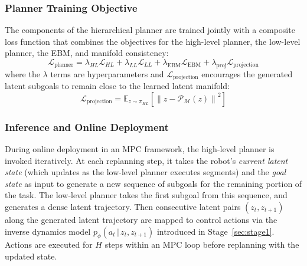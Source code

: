\documentclass{article} %
\begin{document}
\subsubsection{Planner Training Objective}
\vspace{-5pt}
The components of the hierarchical planner are trained jointly with a composite loss function that combines the objectives for the high-level planner, the low-level planner, the EBM, and manifold consistency:
\begin{equation}
\mathcal{L}_{\text{planner}} = \lambda_{HL} \mathcal{L}_{HL} + \lambda_{LL} \mathcal{L}_{LL} + \lambda_{\text{EBM}} \mathcal{L}_{\text{EBM}} + \lambda_{\text{proj}} \mathcal{L}_{\text{projection}}
\end{equation}
where the $\lambda$ terms are hyperparameters and $\mathcal{L}_{\text{projection}}$ encourages the generated latent subgoals to remain close to the learned latent manifold:
\begin{equation}
\mathcal{L}_{\text{projection}} = \mathbb{E}_{z \sim \pi_{HL}} \left[ \left\| z - \mathcal{P}_{\mathcal{M}}(z) \right\|^2 \right]
\end{equation}

\subsubsection{Inference and Online Deployment}
\vspace{-5pt}
During online deployment in an MPC framework, the high-level planner is invoked iteratively. At each replanning step, it takes the robot's \textit{current latent state} (which updates as the low-level planner executes segments) and the \textit{goal state} as input to generate a new sequence of subgoals for the remaining portion of the task. The low-level planner takes the first subgoal from this sequence, and generates a dense latent trajectory. Then consecutive latent pairs $(z_t, z_{t+1})$ along the generated latent trajectory are mapped to control actions via the inverse dynamics model $p_\phi(a_t\,|\,z_t, z_{t+1})$ introduced in Stage~\ref{sec:stage1}. Actions are executed for $H$ steps within an MPC loop before replanning with the updated state.
\end{document}
